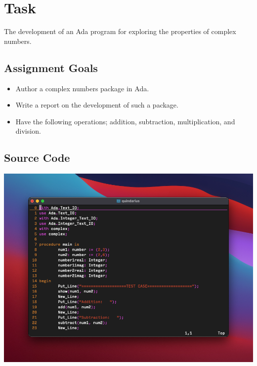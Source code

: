 \documentclass{report}
\begin{document}


\section*{Task}
The development of an Ada program for exploring the properties of complex numbers. 

\vspace{0.5cm}

\subsection*{Assignment Goals}
\begin{itemize}

	\item Author a complex numbers package in Ada.
	\item Write a report on the development of such a package.
	\item Have the following operations; addition, subtraction, multiplication, and division. 
\end{itemize}

\subsection*{Source Code}
\includegraphics[width = \textwidth]{images/ada1}
\end{document}
